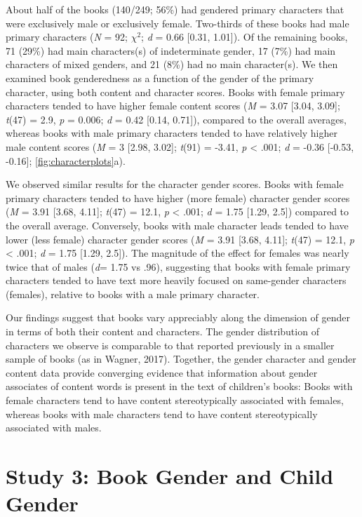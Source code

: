 \documentclass[english,,man,floatsintext]{apa6}
\begin{document}
About half of the books (140/249; 56\%) had gendered primary characters that were exclusively male or exclusively female. Two-thirds of these books had male primary characters (\emph{N} = 92; \(\chi^2\); \emph{d} = 0.66 {[}0.31, 1.01{]}). Of the remaining books, 71 (29\%) had main characters(s) of indeterminate gender, 17 (7\%) had main characters of mixed genders, and 21 (8\%) had no main character(s). We then examined book genderedness as a function of the gender of the primary character, using both content and character scores. Books with female primary characters tended to have higher female content scores (\emph{M} = 3.07 {[}3.04, 3.09{]}; \emph{t}(47) = 2.9, \emph{p} = 0.006; \emph{d} = 0.42 {[}0.14, 0.71{]}), compared to the overall averages, whereas books with male primary characters tended to have relatively higher male content scores (\emph{M} = 3 {[}2.98, 3.02{]}; \emph{t}(91) = -3.41, \emph{p} \textless{} .001; \emph{d} = -0.36 {[}-0.53, -0.16{]}; \autoref{fig:characterplots}a).

We observed similar results for the character gender scores. Books with female primary characters tended to have higher (more female) character gender scores (\emph{M} = 3.91 {[}3.68, 4.11{]}; \emph{t}(47) = 12.1, \emph{p} \textless{} .001; \emph{d} = 1.75 {[}1.29, 2.5{]}) compared to the overall average. Conversely, books with male character leads tended to have lower (less female) character gender scores (\emph{M} = 3.91 {[}3.68, 4.11{]}; \emph{t}(47) = 12.1, \emph{p} \textless{} .001; \emph{d} = 1.75 {[}1.29, 2.5{]}). The magnitude of the effect for females was nearly twice that of males (\emph{d}= 1.75 vs .96), suggesting that books with female primary characters tended to have text more heavily focused on same-gender characters (females), relative to books with a male primary character.

Our findings suggest that books vary appreciably along the dimension of gender in terms of both their content and characters. The gender distribution of characters we observe is comparable to that reported previously in a smaller sample of books (as in Wagner, 2017). Together, the gender character and gender content data provide converging evidence that information about gender associates of content words is present in the text of children's books: Books with female characters tend to have content stereotypically associated with females, whereas books with male characters tend to have content stereotypically associated with males.

\hypertarget{study-3-book-gender-and-child-gender}{%
\section{Study 3: Book Gender and Child Gender}\label{study-3-book-gender-and-child-gender}}
\end{document}
